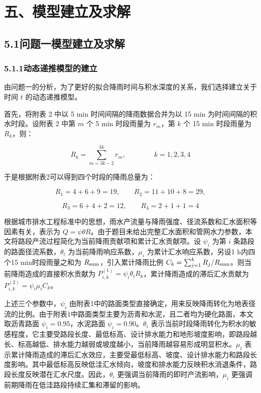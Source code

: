 \documentclass[UTF8,a4paper,12pt]{ctexart}
\begin{document}
\section{五、模型建立及求解}

\subsection{5.1问题一模型建立及求解}

\subsubsection{5.1.1动态递推模型的建立}

由问题一的分析，为了更好的拟合降雨时间与积水深度的关系，我们选择建立关于时间 \(t\) 的动态递推模型。

首先，将附表 2 中以 5 min 时间间隔的降雨数据合并为以 15 min 为时间间隔的积水时段。设附表 2 中第 $m$ 个 5 min 时段雨量为 \(r_m\)，第 $k$ 个 15 min 时段雨量为 \(R_k\)，则：

\[{{R}_{k}}=\sum_{m=3k-2}^{3k}{{r}_{m}},\quad \quad \quad \quad k=1,2,3,4\]

于是根据附表2可以得到四个时段的降雨总量为：

\[{{R}_{1}}=4+6+9=19,\quad \quad {{R}_{2}}=11+10+8=29,\]

\[{{R}_{3}}=6+4+2=12,\quad \quad {{R}_{4}}=2+1+1=4\]

根据城市排水工程标准中的思想，雨水产流量与降雨强度、径流系数和汇水面积等因素有关，表示为 \(Q=\psi\theta R\)。由于题目未给出完整汇水面积和管网水力参数，本文将路段产流过程简化为当前降雨贡献项和累计汇水贡献项。设 \(\psi_i\) 为第 \(i\) 条路段的路面径流系数，\(\theta_i\) 为当前降雨响应系数，\(\mu_i\) 为累计汇水响应系数，另设1 h内四个15 min时段雨量之和为 \(R_{\rm sum}\)，引入累计降雨比例 \(C_k=\sum_{j=1}^{k}R_j/R_{\rm sum}\)。则当前降雨造成的直接积水贡献为 \(P_{i,k}^{(1)}=\psi_i\theta_iR_k\)，累计降雨造成的滞后汇水贡献为 \(P_{i,k}^{(2)}=\psi_i\mu_iC_k\)。

上述三个参数中，\(\psi_i\) 由附表1中的路面类型直接确定，用来反映降雨转化为地表径流的比例。由于附表1中路面类型主要为沥青和水泥，且二者均为硬化路面，本文取沥青路面 \(\psi_i=0.95\)，水泥路面 \(\psi_i=0.90\)。\(\theta_i\) 表示当前时段降雨转化为积水的敏感程度，它主要受路段长度、最低标高、设计排水能力和地形坡度影响，即路段越长、标高越低、排水能力越弱或坡度越小，当前降雨越容易形成明显积水。\(\mu_i\) 表示累计降雨造成的滞后汇水效应，主要受最低标高、坡度、设计排水能力和路段长度影响。其中最低标高反映低洼汇水倾向，坡度和排水能力反映积水消退条件，路段长度反映潜在汇水尺度。因此，\(\theta_i\) 更强调当前降雨的即时产流影响，\(\mu_i\) 更强调前期降雨在低洼路段持续汇集和滞留的影响。
\end{document}
